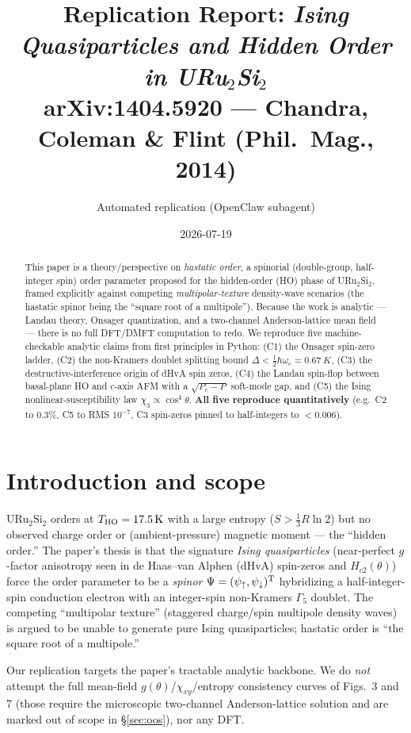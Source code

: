 \documentclass[11pt]{article}
\title{Replication Report: \emph{Ising Quasiparticles and Hidden Order in URu$_2$Si$_2$}\\
\large arXiv:1404.5920 --- Chandra, Coleman \& Flint (Phil.\ Mag., 2014)}
\author{Automated replication (OpenClaw subagent)}
\date{2026-07-19}
\begin{document}
\maketitle

\begin{abstract}
This paper is a theory/perspective on \emph{hastatic order}, a spinorial
(double-group, half-integer spin) order parameter proposed for the hidden-order
(HO) phase of URu$_2$Si$_2$, framed explicitly against competing
\emph{multipolar-texture} density-wave scenarios (the hastatic spinor being the
``square root of a multipole''). Because the work is analytic --- Landau theory,
Onsager quantization, and a two-channel Anderson-lattice mean field --- there is
no full DFT/DMFT computation to redo. We reproduce five machine-checkable
analytic claims from first principles in Python: (C1) the Onsager spin-zero
ladder, (C2) the non-Kramers doublet splitting bound $\Delta<\tfrac12\hbar\omega_c
= \SI{0.67}{K}$, (C3) the destructive-interference origin of dHvA spin zeros,
(C4) the Landau spin-flop between basal-plane HO and $c$-axis AFM with a
$\sqrt{P_c-P}$ soft-mode gap, and (C5) the Ising nonlinear-susceptibility law
$\chi_3\propto\cos^4\theta$. \textbf{All five reproduce quantitatively}
(e.g.\ C2 to $0.3\%$, C5 to RMS $10^{-7}$, C3 spin-zeros pinned to half-integers
to $<0.006$).
\end{abstract}

\section{Introduction and scope}
URu$_2$Si$_2$ orders at $T_{\rm HO}=\SI{17.5}{K}$ with a large entropy
($S>\tfrac13 R\ln 2$) but no observed charge order or (ambient-pressure)
magnetic moment --- the ``hidden order.'' The paper's thesis is that the
signature \emph{Ising quasiparticles} (near-perfect $g$-factor anisotropy seen
in de Haas--van Alphen (dHvA) spin-zeros and $H_{c2}(\theta)$) force the order
parameter to be a \emph{spinor} $\Psi=(\psi_\uparrow,\psi_\downarrow)^{\rm T}$
hybridizing a half-integer-spin conduction electron with an integer-spin
non-Kramers $\Gamma_5$ doublet. The competing ``multipolar texture''
(staggered charge/spin multipole density waves) is argued to be unable to
generate pure Ising quasiparticles; hastatic order is ``the square root of a
multipole.''

Our replication targets the paper's tractable analytic backbone. We do
\emph{not} attempt the full mean-field $g(\theta)$/$\chi_{xy}$/entropy
consistency curves of Figs.~3 and 7 (those require the microscopic two-channel
Anderson-lattice solution and are marked out of scope in
\S\ref{sec:oos}), nor any DFT.
\end{document}
